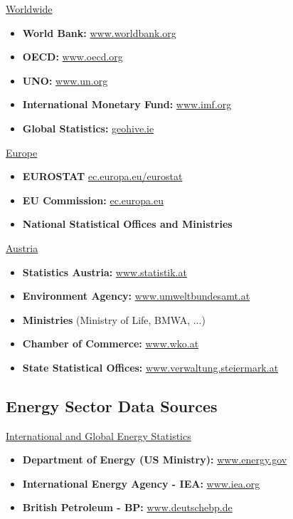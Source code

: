 \documentclass[a4paper, fleqn, headsepline, footsepline, 12pt, parskip=half]{scrartcl}
\begin{document}
\underline{Worldwide}
\begin{itemize}
    \item \textbf{World Bank:} \url{www.worldbank.org}
    \item \textbf{OECD:} \url{www.oecd.org}
    \item \textbf{UNO:} \url{www.un.org}
    \item \textbf{International Monetary Fund:} \url{www.imf.org}
    \item \textbf{Global Statistics:} \url{geohive.ie}
\end{itemize}

\underline{Europe}
\begin{itemize}
    \item \textbf{EUROSTAT} \url{ec.europa.eu/eurostat}
    \item \textbf{EU Commission:} \url{ec.europa.eu}
    \item \textbf{National Statistical Offices and Ministries}
\end{itemize}

\underline{Austria}
\begin{itemize}
    \item \textbf{Statistics Austria:} \url{www.statistik.at}
    \item \textbf{Environment Agency:} \url{www.umweltbundesamt.at}
    \item \textbf{Ministries} (Ministry of Life, BMWA, ...)
    \item \textbf{Chamber of Commerce:} \url{www.wko.at}
    \item \textbf{State Statistical Offices:} \url{www.verwaltung.steiermark.at}
\end{itemize}


\subsection{Energy Sector Data Sources}
\label{sec:energySectorDataSourcesWorldwide}

\underline{International and Global Energy Statistics}
\begin{itemize}
    \item \textbf{Department of Energy (US Ministry):} \url{www.energy.gov}
    \item \textbf{International Energy Agency - IEA:} \url{www.iea.org}
    \item \textbf{British Petroleum - BP:} \url{www.deutschebp.de}
\end{itemize}
\end{document}
